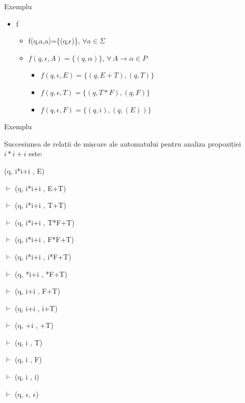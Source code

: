 \documentclass[pdf]{beamer}
\begin{document}
\begin{frame}{Exemplu}

\begin{itemize}
\item
f

\begin{itemize}
\item
f(q,a,a)=\{(q,$\epsilon$)\}, $\forall a \in \Sigma$

\item
$f(q,\epsilon , A)=\{(q,\alpha )\}, \, \forall \, A \to \alpha \in P$

\begin{itemize}
\item
$f(q,\epsilon ,E)=\{(q,E+T),(q,T)\}$

\item
$f(q,\epsilon ,T)=\{(q,T*F),(q,F)\}$

\item
$f(q,\epsilon ,F)=\{(q,i), (q,(E))\}$
\end{itemize}
\end{itemize}
\end{itemize}
\end{frame}



\begin{frame}{Exemplu}

Succesiunea de relații de mișcare ale automatului pentru analiza propoziției $i*i+i$ este:

(q, i*i+i , E) 

$\vdash$ (q, i*i+i , E+T) 

$\vdash$ (q, i*i+i , T+T)

$\vdash$ (q, i*i+i , T*F+T) 	

$\vdash$ (q, i*i+i , F*F+T) 	

$\vdash$ (q, i*i+i , i*F+T)

$\vdash$ (q, *i+i , *F+T)

$\vdash$ (q, i+i , F+T)

$\vdash$ (q, i+i , i+T)

$\vdash$ (q, +i , +T)

$\vdash$ (q, i , T)

$\vdash$ (q, i , F)

$\vdash$ (q, i , i)

$\vdash$ (q, $\epsilon$, $\epsilon$)
\end{frame}
\end{document}
